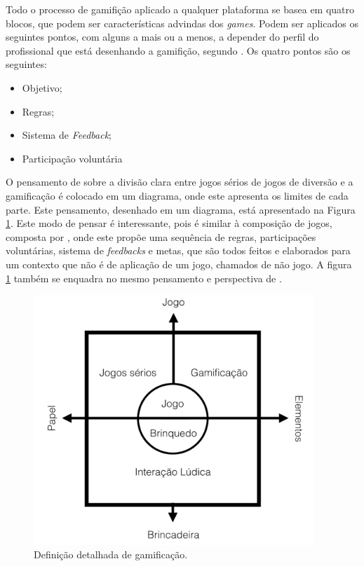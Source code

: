 Todo o processo de gamifição aplicado a qualquer plataforma se basea em
quatro blocos, que podem ser características advindas dos \textit{games}. Podem ser
aplicados os seguintes pontos, com alguns a mais ou a menos, a depender
do perfil do profissional que está desenhando a gamifição, segundo \cite{mcgonigal2011reality}.
Os quatro pontos são os seguintes:

\begin{itemize}
    \item Objetivo;
    \item Regras;
    \item Sistema de \textit{Feedback};
    \item Participação voluntária
\end{itemize}

O pensamento de \cite{deterding2011gamification}  sobre a divisão clara entre jogos sérios
de jogos de diversão e a gamificação é colocado em um diagrama, onde este
apresenta os limites de cada parte. Este pensamento, desenhado em um diagrama,
está apresentado na Figura \ref{fig:gamificacaodetalhada}. Este modo de pensar é interessante, pois
é similar à composição de jogos, composta por \cite{mcgonigal2011reality}, onde este
propõe uma sequência de regras, participações voluntárias, sistema de
\textit{feedbacks} e metas, que são todos feitos e elaborados para um contexto que
não é de aplicação de um jogo, chamados de não jogo. A figura \ref{fig:gamificacaodetalhada}
também se enquadra no mesmo pensamento e perspectiva de \cite{mcgonigal2011reality}.

\begin{figure}[h]
    \centering
    \includegraphics[width=400px, scale=1]{figuras/gamificacaodetalhada}
    \caption{Definição detalhada de gamificação. }
    \label{fig:gamificacaodetalhada}
\end{figure}


